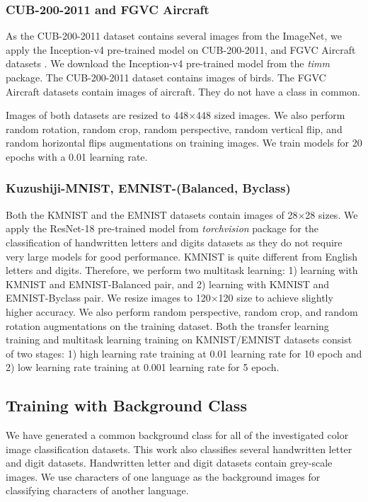 \documentclass{article}
\begin{document}
\subsubsection{CUB-200-2011 and FGVC Aircraft}
As the CUB-200-2011 dataset \cite{wah2011caltech} contains several images from the ImageNet, we apply the Inception-v4 pre-trained model on CUB-200-2011, and  FGVC Aircraft datasets \cite{maji2013fine}. We download the Inception-v4 pre-trained model from the \emph{timm} package. The CUB-200-2011 dataset contains images of birds. The FGVC Aircraft datasets contain images of aircraft.  They do not have a class in common.

Images of both datasets are resized to 448$\times$448 sized images. We also perform random rotation, random crop, random perspective, random vertical flip, and random horizontal flips augmentations on training images. We train models for 20 epochs with a 0.01 learning rate.

\subsubsection{Kuzushiji-MNIST, EMNIST-(Balanced, Byclass)}
Both the KMNIST \cite{clanuwat2018deep} and the EMNIST \cite{cohen2017emnist} datasets contain images of 28$\times$28 sizes.
We apply the ResNet-18 pre-trained model from \emph{torchvision} package for the classification of handwritten letters and digits datasets as they do not require very large models for good performance. KMNIST is quite different from English letters and digits. Therefore, we perform two multitask learning: 1) learning with KMNIST and EMNIST-Balanced pair, and 2) learning with KMNIST and EMNIST-Byclass pair. We resize images to 120$\times$120 size to achieve slightly higher accuracy. We also perform random perspective, random crop, and random rotation augmentations on the training dataset. Both the transfer learning training and multitask learning training on KMNIST/EMNIST datasets consist of two stages: 1) high learning rate training at 0.01 learning rate for 10 epoch and 2) low learning rate training at 0.001 learning rate for 5 epoch.






\subsection{Training with Background Class}
We have generated a common background class for all of the investigated color image classification datasets. This work also classifies several handwritten letter and digit datasets. Handwritten letter and digit datasets contain grey-scale images. We use characters of one language as the background images for classifying characters of another language.
\end{document}
